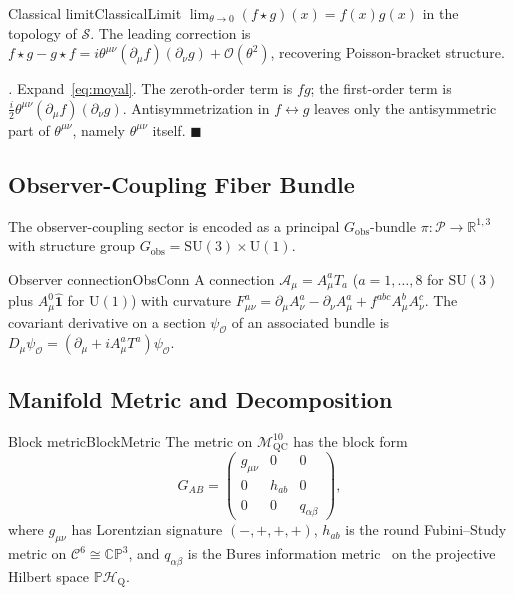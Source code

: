 \documentclass[11pt,a4paper]{article}
\theoremstyle{myrmk}
\renewenvironment{proof}[1][\proofname]{%
  \par\noindent\textit{#1.}\enspace\ignorespaces}{\hfill$\blacksquare$\par\medskip}
\newcommand{\Mmanifold}{\mathcal{M}^{10}_{\mathrm{QC}}}
\newcommand{\cC}{\mathcal{C}^{6}}
\newcommand{\HH}{\mathcal{H}_{\mathrm{Q}}}
\newcommand{\Identity}{\hat{\mathbf{1}}}
\begin{document}
\begin{corollary}{Classical limit}{ClassicalLimit}
$\lim_{\theta\to 0}(f\star g)(x)=f(x)g(x)$ in the topology of $\mathcal{S}$.
The leading correction is
$f\star g - g\star f = i\theta^{\mu\nu}(\partial_\mu f)(\partial_\nu g)+\mathcal{O}(\theta^2)$,
recovering Poisson-bracket structure.
\end{corollary}

\begin{proof}
Expand~\eqref{eq:moyal}. The zeroth-order term is $fg$; the first-order term is
$\tfrac{i}{2}\theta^{\mu\nu}(\partial_\mu f)(\partial_\nu g)$. Antisymmetrization in
$f\leftrightarrow g$ leaves only the antisymmetric part of $\theta^{\mu\nu}$, namely
$\theta^{\mu\nu}$ itself.
\end{proof}

\subsection{Observer-Coupling Fiber Bundle}
\label{sec:fiber}

The observer-coupling sector is encoded as a principal $G_{\mathrm{obs}}$-bundle
$\pi:\mathcal{P}\to\mathbb{R}^{1,3}$ with structure group
$G_{\mathrm{obs}}=\mathrm{SU}(3)\times \mathrm{U}(1)$.

\begin{definition}{Observer connection}{ObsConn}
A connection $\mathcal{A}_{\mu}=A_\mu^a T_a$ ($a=1,\dots,8$ for $\mathrm{SU}(3)$
plus $A_\mu^0\Identity$ for $\mathrm{U}(1)$) with curvature
$F^a_{\mu\nu} = \partial_\mu A^a_\nu - \partial_\nu A^a_\mu + f^{abc}A^b_\mu A^c_\nu.$
The covariant derivative on a section $\psi_{\mathcal{O}}$ of an associated bundle is
$D_\mu\psi_{\mathcal{O}}=(\partial_\mu+iA_\mu^a T^a)\psi_{\mathcal{O}}$.
\end{definition}

\subsection{Manifold Metric and Decomposition}
\label{sec:metric}

\begin{definition}{Block metric}{BlockMetric}
The metric on $\Mmanifold$ has the block form
\begin{equation}
  G_{AB} = \begin{pmatrix} g_{\mu\nu} & 0 & 0 \\ 0 & h_{ab} & 0 \\ 0 & 0 & q_{\alpha\beta}
  \end{pmatrix},
\end{equation}
where $g_{\mu\nu}$ has Lorentzian signature $(-,+,+,+)$, $h_{ab}$ is the round
Fubini--Study metric on $\cC\cong\mathbb{CP}^3$, and $q_{\alpha\beta}$ is the
Bures information metric~\cite{Bures1969,Petz2002} on the projective Hilbert space
$\mathbb{P}\HH$.
\end{definition}
\end{document}
